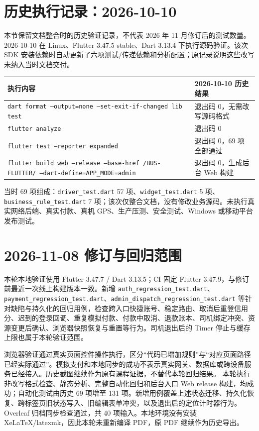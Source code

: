 \documentclass[UTF8,fontset=fandol,zihao=-4,oneside]{ctexrep}
\newcommand{\pathcode}[1]{\nolinkurl{#1}}
\begin{document}
\section{历史执行记录：2026-10-10}
本节保留文档整合时的历史验证记录，不代表 2026 年 11 月修订后的测试数量。2026-10-10 在 Linux、Flutter 3.47.5 stable、Dart 3.13.4 下执行源码验证。该次 SDK 安装依赖时自动更新了六项测试/传递依赖和分析配置；原记录说明这些改写未纳入当时文档交付。
\begin{longtable}{p{7.7cm}p{7cm}}
\toprule 执行内容 & 2026-10-10 历史结果 \\ \midrule
\texttt{dart format --output=none --set-exit-if-changed lib test} & 退出码 0，无需改写源码格式 \\
\texttt{flutter analyze} & 退出码 0 \\
\texttt{flutter test --reporter expanded} & 退出码 0，69 项全部通过 \\
\texttt{flutter build web --release --base-href /BUS-FLUTTER/ --dart-define=APP\_MODE=admin} & 退出码 0，生成后台 Web 构建 \\
\bottomrule
\end{longtable}
当时 69 项组成：\pathcode{driver_test.dart} 57 项、\pathcode{widget_test.dart} 5 项、\pathcode{business_rule_test.dart} 7 项；该次仅整合文档，没有修改业务源码。未执行真实网络后端、真实付款、真机 GPS、生产压测、安全测试、Windows 或移动平台发布测试。

\section{2026-11-08 修订与回归范围}
本轮本地验证使用 Flutter 3.47.7 / Dart 3.13.5；CI 固定 Flutter 3.47.9，与修订前最近一次线上构建版本一致。新增 \pathcode{auth_regression_test.dart}、\pathcode{payment_regression_test.dart}、\pathcode{admin_dispatch_regression_test.dart} 等针对缺陷与持久化的回归用例，检查跨入口快捷账号、稳定路由、取消后重登信用分、迟到的登录回调、重复模拟付款、付款中取消、退款账本、司机绑定冲突、资源变更后确认、浏览器快照恢复与重置等行为。司机退出后的 Timer 停止与缓存上限也属于本轮验证范围。

浏览器验证通过真实页面控件操作执行，区分“代码已增加规则”与“对应页面路径已经实际通过”。模拟支付和本地同步的成功不表示真实网关、数据库或跨设备服务已经接入。历史截图继续作为原有课程证据，不替代本轮回归结果。
本轮执行非改写格式检查、静态分析、完整自动化回归和后台入口 Web release 构建，均成功；自动化测试由历史 69 项增至 131 项。新增用例覆盖上述状态迁移、持久化恢复、跨标签页旧状态写入、旧编辑表单冲突，以及退出后的定位计时器行为。Overleaf 归档同步检查通过，共 40 项输入。本地环境没有安装 XeLaTeX/latexmk，因此本轮未重新编译 PDF，原 PDF 继续作为历史导出。
\end{document}

